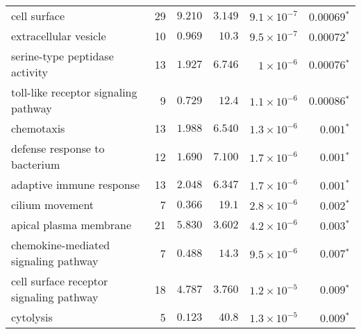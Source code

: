 \begin{longtable*}{|l|r|r|r|r|r|}
    cell surface                                          & 29                      & $ 9.210$                & $ 3.149$   & $9.1\times 10^{-7}$  & $\bm{0.00069{^*}}$              \\
    extracellular vesicle                                 & 10                      & $ 0.969$                & $  10.3$     & $9.5\times 10^{-7}$  & $\bm{0.00072{^*}}$              \\
    serine-type peptidase activity                        & 13                      & $ 1.927$                & $ 6.746$   & $ 1\times 10^{-6}$   & $\bm{0.00076{^*}}$              \\
    toll-like receptor signaling pathway                  & 9                       & $ 0.729$                & $  12.4$     & $1.1\times 10^{-6}$  & $\bm{0.00086{^*}}$              \\
    chemotaxis                                            & 13                      & $ 1.988$                & $ 6.540$   & $1.3\times 10^{-6}$  & $\bm{ 0.001{^*}}$               \\
    defense response to bacterium                         & 12                      & $ 1.690$                & $ 7.100$   & $1.7\times 10^{-6}$  & $\bm{ 0.001{^*}}$               \\
    adaptive immune response                              & 13                      & $ 2.048$                & $ 6.347$   & $1.7\times 10^{-6}$  & $\bm{ 0.001{^*}}$               \\
    cilium movement                                       & 7                       & $ 0.366$                & $  19.1$     & $2.8\times 10^{-6}$  & $\bm{ 0.002{^*}}$               \\
    apical plasma membrane                                & 21                      & $ 5.830$                & $ 3.602$   & $4.2\times 10^{-6}$  & $\bm{ 0.003{^*}}$               \\
    chemokine-mediated signaling pathway                  & 7                       & $ 0.488$                & $  14.3$     & $9.5\times 10^{-6}$  & $\bm{ 0.007{^*}}$               \\
    cell surface receptor signaling pathway               & 18                      & $ 4.787$                & $ 3.760$   & $1.2\times 10^{-5}$ & $\bm{ 0.009{^*}}$ \\
    cytolysis                                             & 5                       & $ 0.123$                & $  40.8$     & $1.3\times 10^{-5}$  & $\bm{ 0.009{^*}}$               \\

\end{longtable*}
